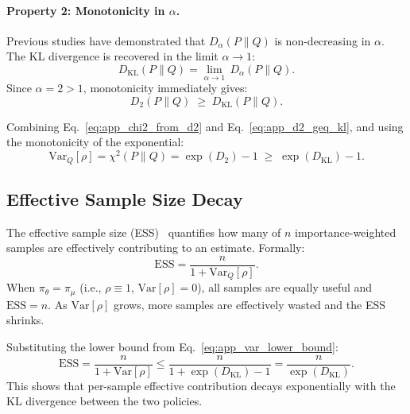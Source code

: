 \documentclass[runningheads]{llncs}
\begin{document}
\paragraph{Property 2: Monotonicity in $\alpha$.}
Previous studies \cite{van_Erven_2014} have demonstrated that $D_\alpha(P\|Q)$ is non-decreasing in $\alpha$. The KL divergence is recovered in the limit $\alpha \to 1$:
\begin{equation}
    D_{\mathrm{KL}}(P \| Q) = \lim_{\alpha \to 1}\, D_\alpha(P \| Q).
\end{equation}
Since $\alpha = 2 > 1$, monotonicity immediately gives:
\begin{equation}
    D_2(P \| Q) \;\geq\; D_{\mathrm{KL}}(P \| Q).
    \label{eq:app_d2_geq_kl}
\end{equation}

Combining Eq.~\eqref{eq:app_chi2_from_d2} and Eq.~\eqref{eq:app_d2_geq_kl}, and using the monotonicity of the exponential:
\begin{equation}
    \mathrm{Var}_Q[\rho]
    = \chi^2(P \| Q)
    = \exp(D_2) - 1
    \;\geq\; \exp(D_{\mathrm{KL}}) - 1.
    \label{eq:app_var_lower_bound}
\end{equation}

\subsection{Effective Sample Size Decay}
\label{app:ess_derivation}

The effective sample size (ESS)~\cite{kong1992note} quantifies how many of $n$ importance-weighted samples are effectively contributing to an estimate. Formally:
\begin{equation}
    \mathrm{ESS} = \frac{n}{1 + \mathrm{Var}_{Q}[\rho]}.
    \label{eq:app_ess_def}
\end{equation}
When $\pi_\theta = \pi_\mu$ (i.e., $\rho \equiv 1$, $\mathrm{Var}[\rho] = 0$), all samples are equally useful and $\mathrm{ESS} = n$. As $\mathrm{Var}[\rho]$ grows, more samples are effectively wasted and the ESS shrinks.

Substituting the lower bound from Eq.~\eqref{eq:app_var_lower_bound}:
\begin{equation}
    \mathrm{ESS}
    = \frac{n}{1 + \mathrm{Var}[\rho]}
    \leq \frac{n}{1 + \exp(D_{\mathrm{KL}}) - 1}
    = \frac{n}{\exp(D_{\mathrm{KL}})}.
    \label{eq:app_ess_step1}
\end{equation}
This shows that per-sample effective contribution decays exponentially with the KL divergence between the two policies.
\end{document}
